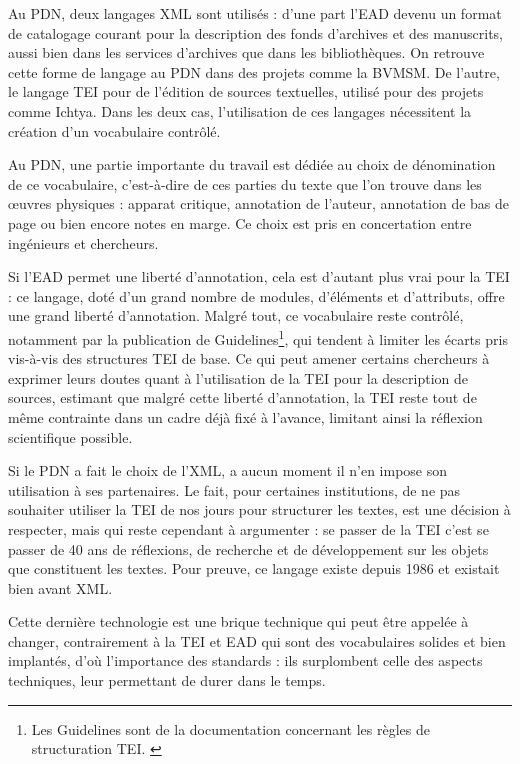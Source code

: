 \documentclass[a4paper,12pt,twoside]{book}
\begin{document}
   Au \acrshort{PDN}, deux langages XML sont utilisés : d'une part l'\acrshort{EAD} devenu un format de catalogage courant pour la description des fonds d'archives et des manuscrits, aussi bien dans les services d'archives que dans les bibliothèques. On retrouve cette forme de langage au \acrshort{PDN} dans des projets comme la \acrshort{BVMSM}. De l'autre, le langage TEI pour de l'édition de sources textuelles, utilisé pour des projets comme Ichtya. Dans les deux cas, l'utilisation de ces langages nécessitent la création d'un vocabulaire contrôlé.
   
   Au \acrshort{PDN}, une partie importante du travail est dédiée au choix de dénomination de ce vocabulaire, c'est-à-dire de ces parties du texte que l'on trouve dans les \oe{}uvres physiques : apparat critique, annotation de l'auteur, annotation de bas de page ou bien encore notes en marge. Ce choix est pris en concertation entre ingénieurs et chercheurs.
   
   Si l'\acrshort{EAD} permet une liberté d'annotation, cela est d'autant plus vrai pour la \acrshort{TEI} : ce langage, doté d'un grand nombre de modules, d'éléments et d'attributs, offre une grand liberté d'annotation. Malgré tout, ce vocabulaire reste contrôlé, notamment par la publication de Guidelines\footnote{Les Guidelines sont de la documentation concernant les règles de structuration TEI. \cite{guidelines}}, qui tendent à limiter les écarts pris vis-à-vis des structures \acrshort{TEI} de base. Ce qui peut amener certains chercheurs à exprimer leurs doutes quant à l'utilisation de la TEI pour la description de sources, estimant que malgré cette liberté d'annotation, la \acrshort{TEI} reste tout de même contrainte dans un cadre déjà fixé à l'avance, limitant ainsi la réflexion scientifique possible.
   
   Si le \acrshort{PDN} a fait le choix de l'\acrshort{XML}, a aucun moment il n'en impose son utilisation à ses partenaires. Le fait, pour certaines institutions, de ne pas souhaiter utiliser la \acrshort{TEI} de nos jours pour structurer les textes, est une décision à respecter, mais qui reste cependant à argumenter : se passer de la \acrshort{TEI} c'est se passer de 40 ans de réflexions, de recherche et de développement sur les objets que constituent les textes. Pour preuve, ce langage existe depuis 1986 et existait bien avant \acrshort{XML}.
   
   Cette dernière technologie est une brique technique qui peut être appelée à changer, contrairement à la \acrshort{TEI} et \acrshort{EAD} qui sont des vocabulaires solides et bien implantés, d'où l'importance des standards : ils surplombent celle des aspects techniques, leur permettant de durer dans le temps.
   
\end{document}
